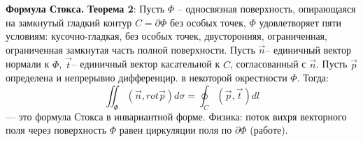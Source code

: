 \par \textbf{Формула Стокса.} \textbf{Теорема 2}: Пусть $\Phi$ – односвязная поверхность, опирающаяся на замкнутый гладкий контур $C=\partial \Phi$ без особых точек, $\Phi$ удовлетворяет пяти условиям: кусочно-гладкая, без особых точек, двусторонняя, ограниченная, ограниченная замкнутая часть полной
поверхности. Пусть $\overrightarrow{n}$– единичный вектор нормали к $\Phi$, $\overrightarrow{t}$–
единичный вектор касательной к $C$, согласованный с $\overrightarrow{n}$. Пусть
$\overrightarrow{p}$ определена и непрерывно дифференцир.
в некоторой окрестности $\Phi$. Тогда:
\begin{equation*} \iint _{\Phi }\left( \overrightarrow{n},rot\overrightarrow{p}\right) d\sigma=\oint _{C}\left( \overrightarrow{p},\overrightarrow{t}\right) dl \end{equation*}
--- это формула Стокса в инвариантной форме.
Физика: поток вихря векторного поля через поверхность $\Phi$ равен циркуляции поля по $\partial \Phi$ (работе).

